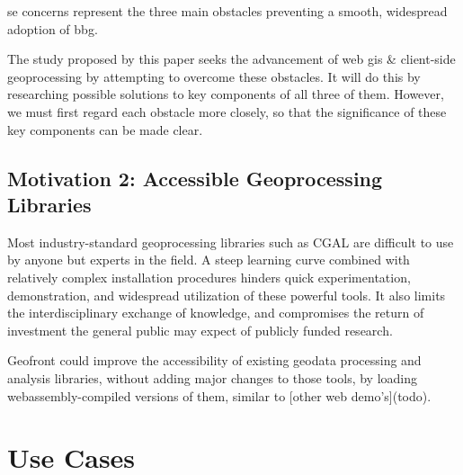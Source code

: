se concerns represent the three main obstacles preventing a smooth, widespread adoption of \ac{bbg}. 

The study proposed by this paper seeks the advancement of web \ac{gis} \& client-side geoprocessing by attempting to overcome these obstacles. It will do this by researching possible solutions to key components of all three of them. However, we must first regard each obstacle more closely, so that the significance of these key components can be made clear. 

\subsection{Motivation 2: Accessible Geoprocessing Libraries}

Most industry-standard geoprocessing libraries such as CGAL are difficult to use by anyone but experts in the field. A steep learning curve combined with relatively complex installation procedures hinders quick experimentation, demonstration, and widespread utilization of these powerful tools. It also limits the interdisciplinary exchange of knowledge, and compromises the return of investment the general public may expect of publicly funded research.

Geofront could improve the accessibility of existing geodata processing and analysis libraries, without adding major changes to those tools, by loading webassembly-compiled versions of them, similar to [other web demo's](todo).


\section{Use Cases}






